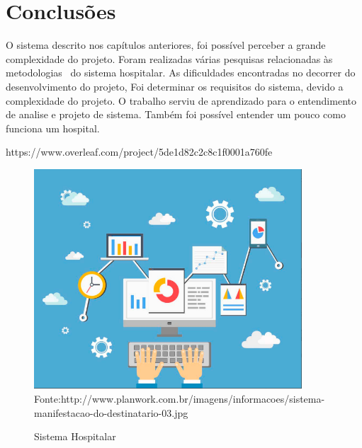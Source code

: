 

\chapter{Conclus\~{o}es}
O sistema descrito nos capítulos anteriores, foi possível perceber a grande complexidade do projeto. Foram realizadas várias pesquisas relacionadas às metodologias  do sistema hospitalar. As dificuldades encontradas no decorrer do desenvolvimento do projeto, Foi determinar os requisitos do sistema, devido a complexidade do projeto. O trabalho serviu de aprendizado para o entendimento de analise e projeto de sistema. Também foi possível entender um pouco como funciona um hospital.


https://www.overleaf.com/project/5de1d82c2c8c1f0001a760fe
   \begin{figure}[H]
    \begin{center}
            \caption{Sistema Hospitalar} \label{sistema}

        \includegraphics[width=10cm]{Pictures/FiguraSistema.png}
                            {\tiny \sf Fonte:http://www.planwork.com.br/imagens/informacoes/sistema-manifestacao-do-destinatario-03.jpg}

        
    \end{center}
   \end{figure} 